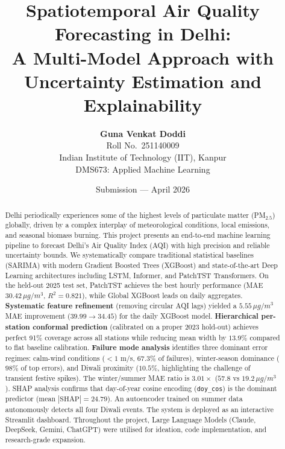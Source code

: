 \documentclass[11pt,a4paper]{article}
\title{\textbf{Spatiotemporal Air Quality Forecasting in Delhi:\\A Multi-Model Approach with Uncertainty Estimation and Explainability}}
\author{
  \textbf{Guna Venkat Doddi} \\
  Roll No.\ 251140009 \\
  Indian Institute of Technology (IIT), Kanpur \\
  DMS673: Applied Machine Learning
}
\date{Submission --- April 2026}
\begin{document}
\maketitle

\begin{abstract}
Delhi periodically experiences some of the highest levels of particulate matter (PM$_{2.5}$) globally, driven by a complex interplay of meteorological conditions, local emissions, and seasonal biomass burning. This project presents an end-to-end machine learning pipeline to forecast Delhi's Air Quality Index (AQI) with high precision and reliable uncertainty bounds. We systematically compare traditional statistical baselines (SARIMA) with modern Gradient Boosted Trees (XGBoost) and state-of-the-art Deep Learning architectures including LSTM, Informer, and PatchTST Transformers. On the held-out 2025 test set, PatchTST achieves the best hourly performance (MAE $30.42\,\mu g/m^3$, $R^2=0.821$), while Global XGBoost leads on daily aggregates. \textbf{Systematic feature refinement} (removing circular AQI lags) yielded a $5.55\,\mu g/m^3$ MAE improvement ($39.99 \to 34.45$) for the daily XGBoost model. \textbf{Hierarchical per-station conformal prediction} (calibrated on a proper 2023 hold-out) achieves perfect 91\% coverage across all stations while reducing mean width by $13.9\%$ compared to flat baseline calibration. \textbf{Failure mode analysis} identifies three dominant error regimes: calm-wind conditions ($<1$ m/s, $67.3\%$ of failures), winter-season dominance ($98\%$ of top errors), and Diwali proximity ($10.5\%$, highlighting the challenge of transient festive spikes). The winter/summer MAE ratio is $\mathbf{3.01\times}$ ($57.8$ vs $19.2\,\mu g/m^3$). SHAP analysis confirms that day-of-year cosine encoding (\texttt{doy\_cos}) is the dominant predictor (mean $|\text{SHAP}|=24.79$). An autoencoder trained on summer data autonomously detects all four Diwali events. The system is deployed as an interactive Streamlit dashboard. Throughout the project, Large Language Models (Claude, DeepSeek, Gemini, ChatGPT) were utilised for ideation, code implementation, and research-grade expansion.
\end{abstract}

\end{document}
